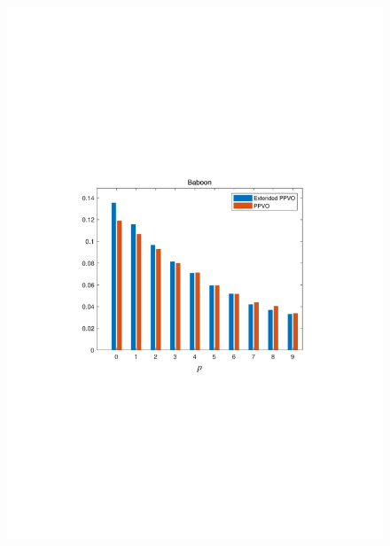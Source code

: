 \documentclass[review,3p,10pt,sort&compress]{elsarticle}
\begin{document}
\begin{figure}
{\begin{minipage}[t]{0.225\linewidth}
    \includegraphics[width=1\textwidth]{figures/Comparison/baboon.pdf}
    \end{minipage}
}
\end{figure}
\end{document}
